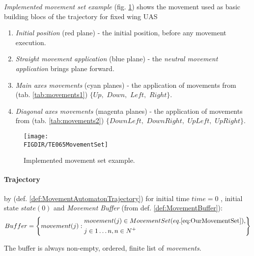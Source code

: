 \emph{Implemented movement set example} (fig. \ref{fig:implementedMovementSetExample}) shows the movement used as basic building blocs of the trajectory for fixed wing UAS
\begin{enumerate}
    \item \emph{Initial position} (red plane) - the initial position, before any movement execution.
    
    \item \emph{Straight movement application} (blue plane) - the \emph{neutral movement application} brings plane forward. 
    
    \item \emph{Main axes movements} (cyan planes) - the application of movements from (tab. \ref{tab:movements1}) $\{Up,$ $Down,$ $Left,$ $Right\}$.
    
    \item \emph{Diagonal axes movements} (magenta planes) - the application of movements from (tab. \ref{tab:movements2}) $\{Down Left,$ $Down Right,$  $Up Left,$   $Up Right\}$.
 \end{enumerate}
\begin{figure}[H]
    \centering
    \texttt{[image: \\FIGDIR/TE065MovementSet]}
    \caption{Implemented movement set example.}
    \label{fig:implementedMovementSetExample}
\end{figure}

\paragraph{Trajectory} by (def. \ref{def:MovementAutomatonTrajectory}) for initial time $time = 0$ , initial state $state(0)$ and \emph{Movement Buffer} (from def. \ref{def:MovementBuffer}):
\begin{equation}\label{eq:ourBuffer}
    Buffer = \left\{
                movement(j):
                \begin{aligned}
                    &movement(j)\in Movement Set (eq. \ref{eq:OurMovementSet}),\\
                    & j \in 1\dots n, n \in N^+
                \end{aligned}
            \right\}
\end{equation}

\begin{assumption}
    The buffer is always non-empty, ordered, finite list of \emph{movements}.
\end{assumption}

